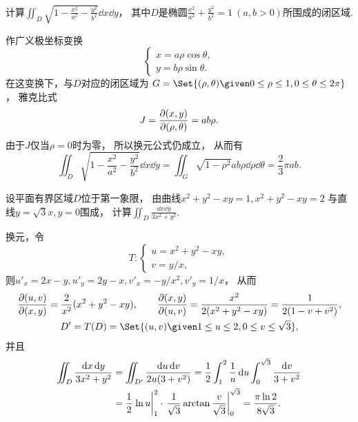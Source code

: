 \begin{example}
计算\(\iint_D \sqrt{1 - \frac{x^2}{a^2} - \frac{y^2}{b^2}} \dd{x} \dd{y}\)，
其中\(D\)是椭圆\(\frac{x^2}{a^2} + \frac{y^2}{b^2} = 1\ (a,b>0)\)所围成的闭区域.
\begin{solution}
作广义极坐标变换\[
	\left\{ \begin{array}{l}
		x = a \rho \cos\theta, \\
		y = b \rho \sin\theta.
	\end{array} \right.
\]
在这变换下，与\(D\)对应的闭区域为
\(G = \Set{(\rho,\theta) \given 0\leq\rho\leq1,0\leq\theta\leq2\pi}\)，
雅克比式\[
	J = \pdv{ (x,y) }{ (\rho,\theta) } = ab\rho.
\]
由于\(J\)仅当\(\rho=0\)时为零，
所以换元公式仍成立，
从而有\[
	\iint_D \sqrt{1 - \frac{x^2}{a^2} - \frac{y^2}{b^2}} \dd{x} \dd{y}
	= \iint_G \sqrt{1-\rho^2} ab\rho \dd{\rho} \dd{\theta}
	= \frac23 \pi ab.
\]
\end{solution}
\end{example}

\begin{example}
设平面有界区域\(D\)位于第一象限，
由曲线\(x^2+y^2-xy=1,
x^2+y^2-xy=2\)
与直线\(y=\sqrt3 x,
y=0\)围成，
计算\(\iint_D \frac{\dd{x}\dd{y}}{3x^2+y^2}\).
\begin{solution}
换元，令\begin{equation*}
	T: \left\{ \begin{array}{l}
		u=x^2+y^2-xy, \\
		v=y/x,
	\end{array} \right.
\end{equation*}
则\(u'_x=2x-y,
u'_y=2y-x,
v'_x=-y/x^2,
v'_y=1/x\)，
从而\begin{gather*}
	\jacobi{u,v}{x,y} = \frac2{x^2} (x^2+y^2-xy),
	\qquad
	\jacobi{x,y}{u,v} = \frac{x^2}{2(x^2+y^2-xy)}
	= \frac1{2(1-v+v^2)}, \\
	D' = T(D)
	= \Set{ (u,v) \given 1 \leq u \leq 2, 0 \leq v \leq \sqrt3 },
\end{gather*}
并且\begin{align*}
	\iint_D \frac{\dd{x}\dd{y}}{3x^2+y^2}
	&= \iint_{D'} \frac{\dd{u}\dd{v}}{2u(3+v^2)}
	= \frac12 \int_1^2 \frac1u \dd{u} \int_0^{\sqrt3} \frac{\dd{v}}{3+v^2} \\
	&= \frac12 \eval{\ln u}_1^2 \cdot \eval{\frac1{\sqrt3} \arctan\frac{v}{\sqrt3}}_0^{\sqrt3}
	= \frac{\pi \ln2}{8\sqrt3}.
\end{align*}
\end{solution}
\end{example}

